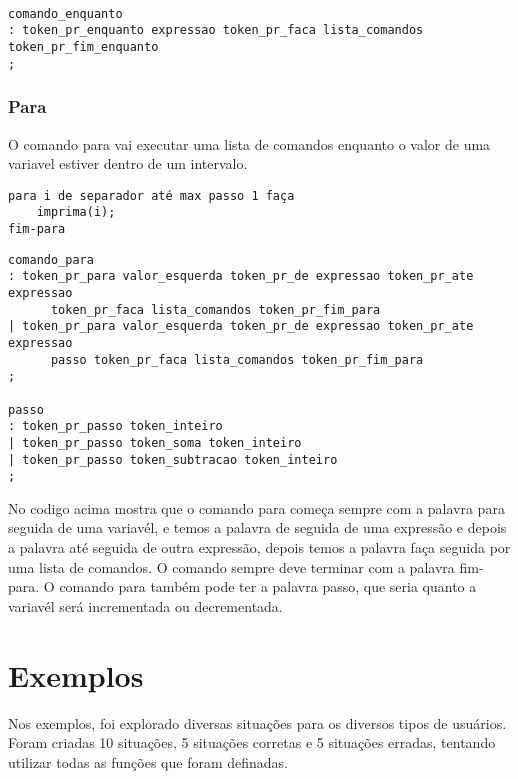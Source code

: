 \documentclass[a4paper,10pt]{article}
\begin{document}
\begin{verbatim}

comando_enquanto
: token_pr_enquanto expressao token_pr_faca lista_comandos token_pr_fim_enquanto
;
\end{verbatim}

\subsubsection{Para}

O comando para vai executar uma lista de comandos enquanto o valor de uma variavel estiver dentro de um intervalo.
\begin{verbatim}
para i de separador até max passo 1 faça
    imprima(i);
fim-para
\end{verbatim}

\begin{verbatim}
comando_para
: token_pr_para valor_esquerda token_pr_de expressao token_pr_ate expressao
      token_pr_faca lista_comandos token_pr_fim_para
| token_pr_para valor_esquerda token_pr_de expressao token_pr_ate expressao 
      passo token_pr_faca lista_comandos token_pr_fim_para
;

passo
: token_pr_passo token_inteiro
| token_pr_passo token_soma token_inteiro
| token_pr_passo token_subtracao token_inteiro
;
\end{verbatim}

No codigo acima mostra que o comando para começa sempre com a palavra para seguida de uma variavél, e temos a palavra de seguida de uma expressão e depois a palavra até seguida de outra expressão, depois temos a palavra faça seguida por uma lista de comandos. O comando sempre deve terminar com a palavra fim-para.
O comando para também pode ter a palavra passo, que seria quanto a variavél será incrementada ou decrementada.


\section{Exemplos}
Nos exemplos, foi explorado diversas situações para os diversos tipos de usuários. Foram criadas 10 situações, 5 situações corretas e 5
situações erradas, tentando utilizar todas as funções que foram definadas.
\end{document}
